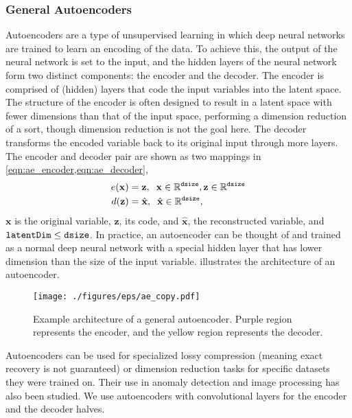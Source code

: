\documentclass[final,3p]{elsarticle}
\theoremstyle{break}
\newcommand{\R}{\mathbb{R}}
\newcommand{\bb}[1]{\mathbf{#1}}
\begin{document}
\subsubsection{General Autoencoders}\label{methods:AE}
Autoencoders are a type of unsupervised learning in which deep neural networks are trained to learn an encoding of the data. 
To achieve this, the output of the neural network is set to the input, and the hidden layers of the neural network form two distinct components: the encoder and the decoder.
The encoder is comprised of (hidden) layers that code the input variables into the latent space.
The structure of the encoder is often designed to result in a latent space with fewer dimensions than that of the input space, performing a dimension reduction of a sort, though dimension reduction is not the goal here.
The decoder transforms the encoded variable back to its original input through more layers.
The encoder and decoder pair are shown as two mappings in \cref{eqn:ae_encoder,eqn:ae_decoder},
\begin{align}
e(\bb{x}) &= \bb{z},\;\;\bb{x}\in\R^{\text{{\tt dsize}}}, \bb{z}\in\R^{\text{{\tt dsize}}} \label{eqn:ae_encoder}\\
d(\bb{z}) &= \hat{\bb{x}},\;\; \hat{\bb{x}} \in \R^{\text{{\tt dsize}}}, \label{eqn:ae_decoder}
\end{align}
$\bb{x}$ is the original variable, $\bb{z}$, its code, and $\hat{\bb{x}}$, the reconstructed variable, and ${\text{\tt latentDim}} \leq {\text{\tt dsize}}$.
In practice, an autoencoder can be thought of and trained as a normal deep neural network with a special hidden layer that has lower dimension than the size of the input variable.
 illustrates the architecture of an autoencoder.
\begin{figure}[h]
 	\centering
 	\vspace{-10pt}
 	\texttt{[image: ./figures/eps/ae\_copy.pdf]}
 	\vspace{-10pt}
 	\caption{\label{fig:ae} Example architecture of a general autoencoder. Purple region represents the encoder, and the yellow region represents the decoder.}
\end{figure}

Autoencoders can be used for specialized lossy compression (meaning exact recovery is not guaranteed) or dimension reduction tasks for specific datasets they were trained on. 
Their use in anomaly detection and image processing has also been studied.
We use autoencoders with convolutional layers for the encoder and the decoder halves.
\end{document}

